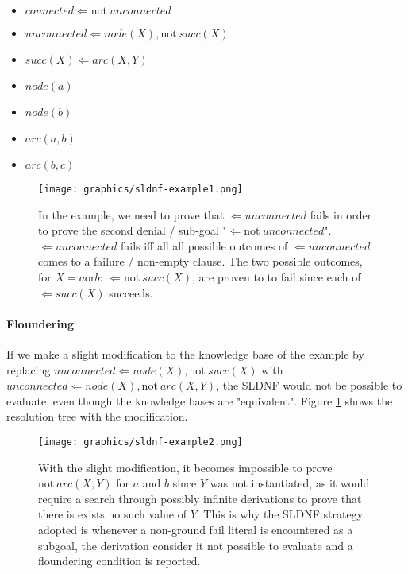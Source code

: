 \documentclass{article}
\theoremstyle{plain}
\theoremstyle{definition}
\begin{document}
\begin{multicols}{2}
\begin{itemize}
\setlength\itemsep{0.1em}
\item[] $connected \Leftarrow \text{not}\ unconnected$
\item[] $unconnected \Leftarrow node(X), \text{not}\ succ(X)$
\item[] $succ(X) \Leftarrow arc(X, Y)$
\item[] $node(a)$
\item[] $node(b)$
\item[] $arc(a, b)$
\item[] $arc(b, c)$
\end{itemize}

\begin{figure}[H]
\centering
\texttt{[image: graphics/sldnf-example1.png]}
\caption{ In the example, we need to prove that $\Leftarrow unconnected$ fails in order to prove the second denial / sub-goal "$\Leftarrow \text{not}\ unconnected$". $\Leftarrow unconnected$ fails iff all all possible outcomes of $\Leftarrow unconnected$ comes to a failure / non-empty clause. The two possible outcomes, for $X = a \text{or} b$: $\Leftarrow \text{not}\ succ(X)$, are proven to to fail since each of $\Leftarrow succ(X)$ succeeds.}
\end{figure}

\paragraph{Floundering} If we make a slight modification to the knowledge base of the example by replacing $unconnected \Leftarrow node(X), \text{not}\ succ(X)$ with $unconnected \Leftarrow node(X), \text{not}\ arc(X, Y)$, the SLDNF would not be possible to evaluate, even though the knowledge bases are "equivalent". Figure \ref{fig:sldnf-example2} shows the resolution tree with the modification.

\begin{figure}[H]
\centering
\texttt{[image: graphics/sldnf-example2.png]}
\caption{With the slight modification, it becomes impossible to prove $\text{not}\ arc(X, Y)$ for $a$ and $b$ since $Y$ was not instantiated, as it would require a search through possibly infinite derivations to prove that there is exists no such value of $Y$. This is why the SLDNF strategy adopted is whenever a non-ground fail literal is encountered as a subgoal, the derivation consider it not possible to evaluate and a floundering condition is reported.}
\label{fig:sldnf-example2}
\end{figure}


\end{multicols}
\end{document}
